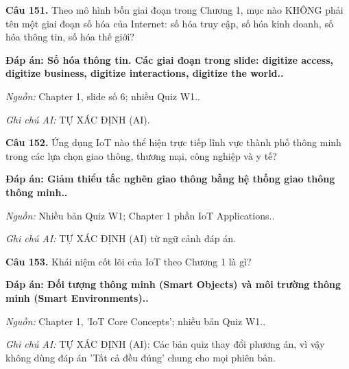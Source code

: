 \documentclass[11pt,a4paper]{article}
\begin{document}
\textbf{Câu 151.} Theo mô hình bốn giai đoạn trong Chương 1, mục nào KHÔNG phải tên một giai đoạn số hóa của Internet: số hóa truy cập, số hóa kinh doanh, số hóa thông tin, số hóa thế giới?\par
{\color{answer}\textbf{Đáp án: Số hóa thông tin. Các giai đoạn trong slide: digitize access, digitize business, digitize interactions, digitize the world..}}\par
{\footnotesize\color{sourcegray}\textit{Nguồn:} Chapter 1, slide số 6; nhiều Quiz W1..\par}
{\footnotesize\color{sourcegray}\textit{Ghi chú AI:} TỰ XÁC ĐỊNH (AI).\par}
\vspace{3pt}\par\noindent{\color{black!18}\rule{\linewidth}{0.3pt}}\par\medskip

\textbf{Câu 152.} Ứng dụng IoT nào thể hiện trực tiếp lĩnh vực thành phố thông minh trong các lựa chọn giao thông, thương mại, công nghiệp và y tế?\par
{\color{answer}\textbf{Đáp án: Giảm thiểu tắc nghẽn giao thông bằng hệ thống giao thông thông minh..}}\par
{\footnotesize\color{sourcegray}\textit{Nguồn:} Nhiều bản Quiz W1; Chapter 1 phần IoT Applications..\par}
{\footnotesize\color{sourcegray}\textit{Ghi chú AI:} TỰ XÁC ĐỊNH (AI) từ ngữ cảnh đáp án.\par}
\vspace{3pt}\par\noindent{\color{black!18}\rule{\linewidth}{0.3pt}}\par\medskip

\textbf{Câu 153.} Khái niệm cốt lõi của IoT theo Chương 1 là gì?\par
{\color{answer}\textbf{Đáp án: Đối tượng thông minh (Smart Objects) và môi trường thông minh (Smart Environments)..}}\par
{\footnotesize\color{sourcegray}\textit{Nguồn:} Chapter 1, 'IoT Core Concepts'; nhiều bản Quiz W1..\par}
{\footnotesize\color{sourcegray}\textit{Ghi chú AI:} TỰ XÁC ĐỊNH (AI): Các bản quiz thay đổi phương án, vì vậy không dùng đáp án 'Tất cả đều đúng' chung cho mọi phiên bản.\par}
\vspace{3pt}\par\noindent{\color{black!18}\rule{\linewidth}{0.3pt}}\par\medskip
\end{document}
